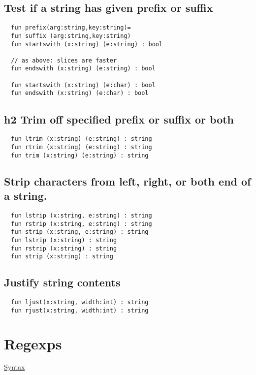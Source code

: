 \documentclass[oneside]{book}
\begin{document}
\subsection{Test if a string has given prefix or suffix}
\begin{verbatim}
  fun prefix(arg:string,key:string)=
  fun suffix (arg:string,key:string)
  fun startswith (x:string) (e:string) : bool

  // as above: slices are faster
  fun endswith (x:string) (e:string) : bool

  fun startswith (x:string) (e:char) : bool 
  fun endswith (x:string) (e:char) : bool
\end{verbatim}

\subsection{h2 Trim off specified prefix or suffix or both}
\begin{verbatim}
  fun ltrim (x:string) (e:string) : string 
  fun rtrim (x:string) (e:string) : string
  fun trim (x:string) (e:string) : string
\end{verbatim}

\subsection{Strip characters from left, right, or both end of a string.}
\begin{verbatim}
  fun lstrip (x:string, e:string) : string
  fun rstrip (x:string, e:string) : string
  fun strip (x:string, e:string) : string
  fun lstrip (x:string) : string
  fun rstrip (x:string) : string
  fun strip (x:string) : string
\end{verbatim}

\subsection{Justify string contents}
\begin{verbatim}
  fun ljust(x:string, width:int) : string
  fun rjust(x:string, width:int) : string
\end{verbatim}

\section{Regexps}

\href{http://felix-lang.org/share/lib/grammar/regexps.fsyn}{Syntax}
\end{document}
